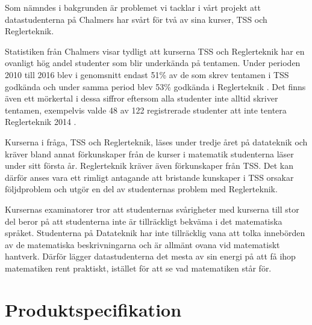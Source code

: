 \documentclass[]{article}
\begin{document}

Som nämndes i bakgrunden är problemet vi tacklar i vårt projekt att
datastudenterna på Chalmers har svårt för två av sina kurser, TSS och
Reglerteknik.

Statistiken från Chalmers visar tydligt att kurserna TSS och
Reglerteknik har en ovanligt hög andel studenter som blir
underkända på tentamen. Under perioden 2010 till 2016 blev i genomsnitt
endast 51\% av de som skrev tentamen i TSS godkända och under samma
period blev 53\% godkända i Reglerteknik \cite{tentastatistik}.
Det finns även ett mörkertal i dessa siffror eftersom alla studenter
inte alltid skriver tentamen, exempelvis valde 48 av 122 registrerade
studenter att inte tentera Reglerteknik 2014
\cite{kursinformation:ere102:14-15}.

Kurserna i fråga, TSS och Reglerteknik, läses under tredje året på
datateknik och kräver bland annat förkunskaper från de kurser i
matematik studenterna läser under sitt första år. Reglerteknik kräver
även förkunskaper från TSS. Det kan därför anses vara ett rimligt
antagande att bristande kunskaper i TSS orsakar följdproblem och utgör
en del av studenternas problem med Reglerteknik.

Kursernas examinatorer tror att studenternas svårigheter med kurserna
till stor del beror på att studenterna inte är tillräckligt bekväma i
det matematiska språket. Studenterna på Datateknik har inte
tillräcklig vana att tolka innebörden av de matematiska
beskrivningarna och är allmänt ovana vid matematiskt hantverk. Därför
lägger datastudenterna det mesta av sin energi på att få ihop
matematiken rent praktiskt, istället för att se vad matematiken står
för.

\section{Produktspecifikation}
\end{document}

